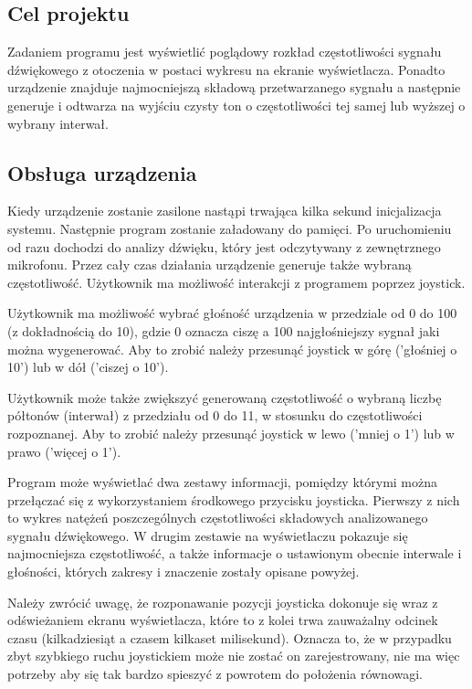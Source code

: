 \subsection{Cel projektu}
Zadaniem programu jest wyświetlić poglądowy rozkład częstotliwości sygnału dźwiękowego z otoczenia w postaci wykresu na ekranie wyświetlacza. Ponadto urządzenie znajduje najmocniejszą składową przetwarzanego sygnału a następnie generuje i odtwarza na wyjściu czysty ton o częstotliwości tej samej lub wyższej o wybrany interwał.

\subsection{Obsługa urządzenia}
Kiedy urządzenie zostanie zasilone nastąpi trwająca kilka sekund inicjalizacja systemu. Następnie program zostanie załadowany do pamięci. Po uruchomieniu od razu dochodzi do analizy dźwięku, który jest odczytywany z zewnętrznego mikrofonu. Przez cały czas działania urządzenie generuje także wybraną częstotliwość. Użytkownik ma możliwość interakcji z programem poprzez joystick.

Użytkownik ma możliwość wybrać głośność urządzenia w przedziale od 0 do 100 (z dokładnością do 10), gdzie 0 oznacza ciszę a 100 najgłośniejszy sygnał jaki można wygenerować. Aby to zrobić należy przesunąć joystick w górę ('głośniej o 10') lub w dół ('ciszej o 10').

Użytkownik może także zwiększyć generowaną częstotliwość o wybraną liczbę półtonów (interwał) z przedziału od 0 do 11, w stosunku do częstotliwości rozpoznanej. Aby to zrobić należy przesunąć joystick w lewo ('mniej o 1') lub w prawo ('więcej o 1').

Program może wyświetlać dwa zestawy informacji, pomiędzy którymi można przełączać się z wykorzystaniem środkowego przycisku joysticka. Pierwszy z nich to wykres natężeń poszczególnych częstotliwości składowych analizowanego sygnału dźwiękowego. W drugim zestawie na wyświetlaczu pokazuje się najmocniejsza częstotliwość, a także informacje o ustawionym obecnie interwale i głośności, których zakresy i znaczenie zostały opisane powyżej.

Należy zwrócić uwagę, że rozponawanie pozycji joysticka dokonuje się wraz z odświeżaniem ekranu wyświetlacza, które to z kolei trwa zauważalny odcinek czasu (kilkadziesiąt a czasem kilkaset milisekund). Oznacza to, że w przypadku zbyt szybkiego ruchu joystickiem może nie zostać on zarejestrowany, nie ma więc potrzeby aby się tak bardzo spieszyć z powrotem do położenia równowagi.
